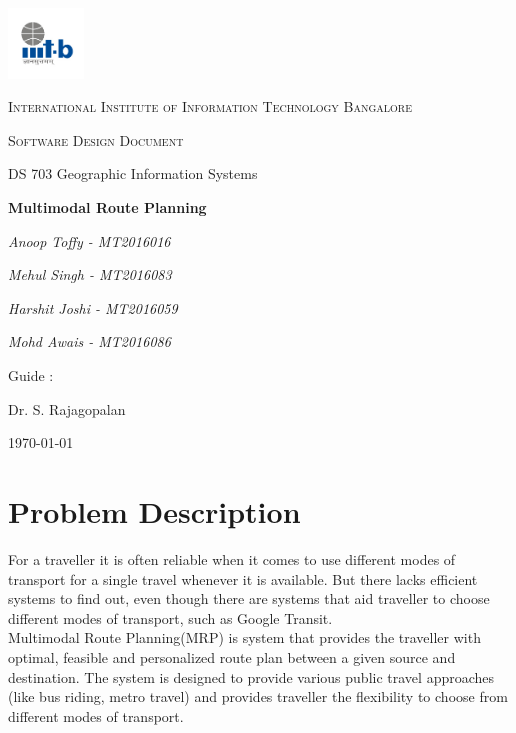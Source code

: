 \documentclass[12pt,a4paper]{article}
\begin{document}
\begin{titlepage}
	\centering
	\includegraphics[width=0.15\textwidth]{IIIT-B_logo.jpg}\par\vspace{1cm}
	{\scshape\LARGE International Institute of Information Technology Bangalore \par}
	\vspace{1cm}
	{\scshape\Large Software Design Document\par}
	{\Large DS 703 Geographic Information Systems\par}
	\vspace{1.5cm}
	{\huge\bfseries Multimodal Route Planning\par}
	\vspace{2cm}	   
	{\Large\itshape Anoop Toffy - MT2016016\par}
	{\Large\itshape Mehul Singh - MT2016083\par}		 
	{\Large\itshape Harshit Joshi - MT2016059\par}	 
	{\Large\itshape Mohd Awais - MT2016086\par}
	\vfill
	Guide : \par
	Dr. S. Rajagopalan

	\vfill

	{\large \today\par}
\end{titlepage}


\tableofcontents
\listoffigures
\listoftables
\newpage

\section{Problem Description}
For a traveller it is often reliable when it comes to use different modes of transport for a single travel whenever it is available. But there lacks efficient systems to find out, even though there are systems that aid traveller to choose different modes of transport, such as Google Transit. \\
Multimodal Route Planning(MRP) is system that provides the traveller with optimal, feasible and personalized route plan between a given source and destination. The system is designed to provide various public travel approaches (like bus riding, metro travel) and provides traveller the flexibility to choose from different modes of transport.
\end{document}
